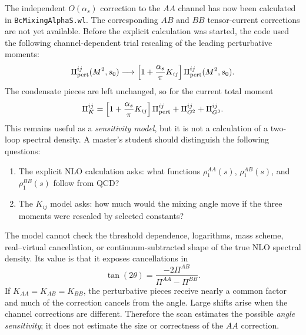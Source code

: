 \documentclass[11pt]{article}
\begin{document}
The independent \(O(\alpha_s)\) correction to the \(AA\) channel has now been
calculated in \texttt{BcMixingAlphaS.wl}.  The corresponding \(AB\) and \(BB\)
tensor-current corrections are not yet available.  Before the explicit
calculation was started, the code used the following channel-dependent trial
rescaling of the leading perturbative moments:
\begin{equation}
  \Pi_{\rm pert}^{ij}(M^2,s_0)
  \longrightarrow
  \left[
    1+\frac{\alpha_s}{\pi}K_{ij}
  \right]
  \Pi_{\rm pert}^{ij}(M^2,s_0).
\end{equation}
The condensate pieces are left unchanged, so for the current total moment
\begin{equation}
  \Pi_{K}^{ij}
  =
  \left[
    1+\frac{\alpha_s}{\pi}K_{ij}
  \right]
  \Pi_{\rm pert}^{ij}
  +
  \Pi_{G^2}^{ij}
  +
  \Pi_{G^3}^{ij}.
\end{equation}
This remains useful as a \emph{sensitivity model}, but it is not a
calculation of a two-loop spectral density.  A master's student should
distinguish the following questions:
\begin{enumerate}
  \item The explicit NLO calculation asks: what functions
  \(\rho_1^{AA}(s)\), \(\rho_1^{AB}(s)\), and \(\rho_1^{BB}(s)\) follow from
  QCD?
  \item The \(K_{ij}\) model asks: how much would the mixing angle move if
  the three moments were rescaled by selected constants?
\end{enumerate}
The model cannot check the threshold dependence, logarithms, mass scheme,
real--virtual cancellation, or continuum-subtracted shape of the true NLO
spectral density.  Its value is that it exposes cancellations in
\begin{equation}
 \tan(2\theta)=
 \frac{-2\Pi^{AB}}{\Pi^{AA}-\Pi^{BB}}.
\end{equation}
If \(K_{AA}=K_{AB}=K_{BB}\), the perturbative pieces receive nearly a common
factor and much of the correction cancels from the angle.  Large shifts arise
when the channel corrections are different.  Therefore the scan estimates
the possible \emph{angle sensitivity}; it does not estimate the size or
correctness of the \(AA\) correction.
\end{document}
